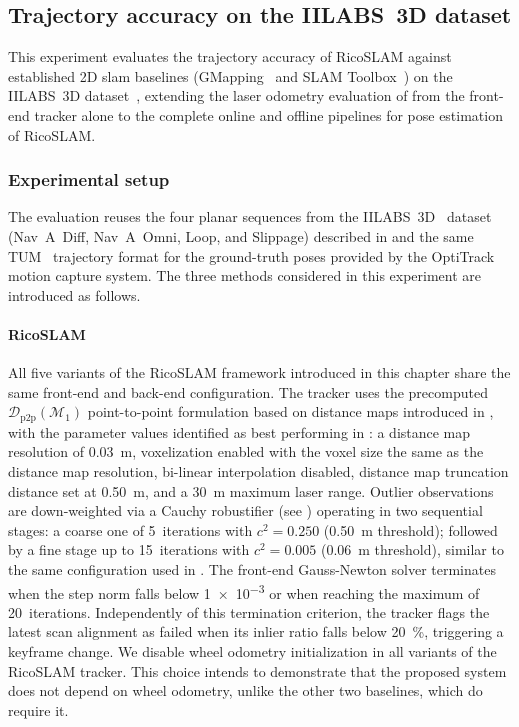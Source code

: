 \subsection{Trajectory accuracy on the IILABS~3D dataset}
\label{sec:slam:results:iilabs3d}

This experiment evaluates the trajectory accuracy of RicoSLAM against
established 2D \gls{slam} baselines
(GMapping~\cite{grisetti:tro:2007} and
SLAM Toolbox~\cite{macenski-jambrecic:joss:2021}) on the IILABS~3D
dataset~\cite{ribeiro:access:2025}, extending the laser odometry evaluation of
 from the front-end tracker alone to
the complete online and offline pipelines for pose estimation of RicoSLAM.

\subsubsection{Experimental setup}
\label{sec:slam:results:iilabs3d:setup}

The evaluation reuses the four planar sequences from the
IILABS~3D~\cite{ribeiro:access:2025} dataset
(Nav~A~Diff, Nav~A~Omni, Loop, and Slippage) described in
 and
the same TUM~\cite{sturm:iros:2012} trajectory format for
the ground-truth poses provided by the OptiTrack motion capture system.
The three methods considered in this experiment are introduced as follows.

\paragraph{RicoSLAM}
All five variants of the RicoSLAM framework introduced in
this chapter share the same front-end and back-end configuration.
The tracker uses the precomputed $\mathcal{D}_\mathrm{p2p}(\mathcal{M}_1)$
point-to-point formulation based on distance maps introduced in
, with the parameter values identified as best
performing in :
a distance map resolution of \SI{0.03}{\metre}, voxelization enabled with the
voxel size the same as the distance map resolution, bi-linear interpolation
disabled, distance map truncation distance set at \SI{0.50}{\metre},
and a \SI{30}{\metre} maximum laser range.
Outlier observations are down-weighted via a Cauchy robustifier
(see )
operating in two sequential stages: a coarse one of 5~iterations with
$c^2=0.250$ (\SI{0.50}{\metre} threshold); followed by a fine stage up to
15~iterations with $c^2 = 0.005$ (\SI{0.06}{\metre} threshold), similar to
the same configuration used in .
The front-end Gauss-Newton solver terminates when the step norm falls below
\num{1e-3} or when reaching the maximum of 20~iterations.
Independently of this termination criterion, the tracker flags the latest scan
alignment as failed when its inlier ratio falls below \SI{20}{\percent},
triggering a keyframe change.
We disable wheel odometry initialization in all variants of the RicoSLAM
tracker. This choice intends to demonstrate that the proposed system does not
depend on wheel odometry, unlike the other two baselines, which do require it.

